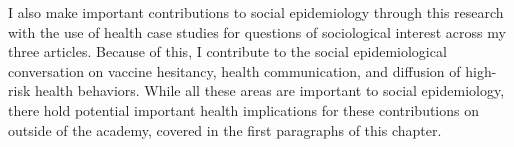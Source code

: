 I also make important contributions to social epidemiology through this
research with the use of health case studies for questions of sociological interest
across my three articles. Because of this, I 
contribute to the social epidemiological conversation on vaccine hesitancy,
health communication, and diffusion of high-risk health behaviors. While
all these areas are important to social epidemiology, there hold
potential important health implications for these contributions on
outside of the academy, covered in the first paragraphs of this chapter.

